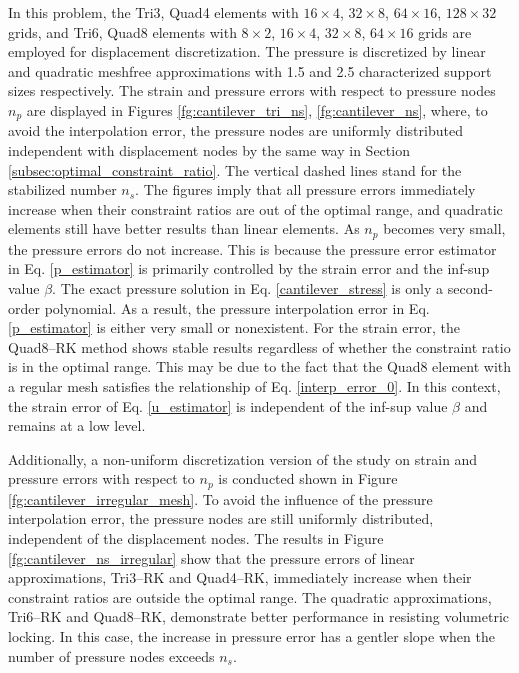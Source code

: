 In this problem, the Tri3, Quad4 elements with $16\times 4$, $32\times 8$, $64\times 16$, $128\times 32$ grids, and Tri6, Quad8 elements with $8\times 2$, $16\times 4$, $32\times 8$, $64\times 16$ grids are employed for displacement discretization. The pressure is discretized by linear and quadratic meshfree approximations with 1.5 and 2.5 characterized support sizes respectively.
The strain and pressure errors with respect to pressure nodes $n_p$ are displayed in Figures \ref{fg:cantilever_tri_ns}, \ref{fg:cantilever_ns}, where, to avoid the interpolation error, the pressure nodes are uniformly distributed independent with displacement nodes by the same way in Section \ref{subsec:optimal_constraint_ratio}. 
The vertical dashed lines stand for the stabilized number $n_s$.
The figures imply that all pressure errors immediately increase when their constraint ratios are out of the optimal range,
and quadratic elements still have better results than linear elements.
As $n_p$ becomes very small, the pressure errors do not increase.
This is because the pressure error estimator in Eq. \eqref{p_estimator} is primarily controlled by the strain error and the inf-sup value $\beta$.
The exact pressure solution in Eq. \eqref{cantilever_stress} is only a second-order polynomial. As a result, the pressure interpolation error in Eq. \eqref{p_estimator} is either very small or nonexistent.
For the strain error, the Quad8--RK method shows stable results regardless of whether the constraint ratio is in the optimal range.
This may be due to the fact that the Quad8 element with a regular mesh satisfies the relationship of Eq. \eqref{interp_error_0}.
In this context, the strain error of Eq. \eqref{u_estimator} is independent of the inf-sup value $\beta$ and remains at a low level.

Additionally, a non-uniform discretization version of the study on strain and pressure errors with respect to $n_p$ is conducted shown in Figure \ref{fg:cantilever_irregular_mesh}.
To avoid the influence of the pressure interpolation error, the pressure nodes are still uniformly distributed, independent of the displacement nodes.
The results in Figure \ref{fg:cantilever_ns_irregular} show that the pressure errors of linear approximations, Tri3--RK and Quad4--RK, immediately increase when their constraint ratios are outside the optimal range.
The quadratic approximations, Tri6--RK and Quad8--RK, demonstrate better performance in resisting volumetric locking.
In this case, the increase in pressure error has a gentler slope when the number of pressure nodes exceeds $n_s$.

